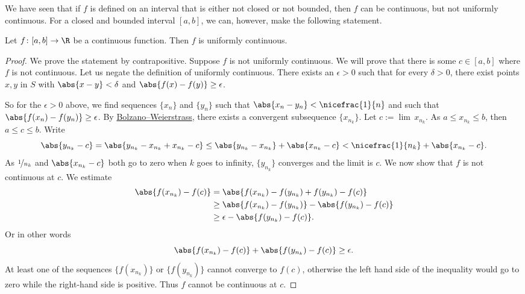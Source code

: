 \documentclass[12pt]{book}
\begin{document}
We have seen that if $f$ is defined on an interval that is either not closed
or not bounded, then $f$ can be continuous, but not uniformly continuous.
For a closed and bounded interval $[a,b]$, we can, however,
make the following statement.

\begin{thm} \label{unifcont:thm}
Let $f \colon [a,b] \to \R$ be a continuous function.
Then $f$
is uniformly continuous.
\end{thm}

\begin{proof}
We prove the statement by contrapositive.
Suppose $f$ is not uniformly continuous.
We will prove
that there is some
$c \in [a,b]$ where $f$ is not continuous.
Let us negate
the definition of uniformly continuous.
There exists an $\epsilon > 0$
such that for every $\delta > 0$, there exist points $x, y$ in $S$ with
$\abs{x-y} < \delta$ and $\abs{f(x)-f(y)} \geq \epsilon$.

So for the $\epsilon > 0$ above,
we find sequences $\{ x_n \}$ and $\{ y_n \}$ such that
$\abs{x_n-y_n} < \nicefrac{1}{n}$ and such that $\abs{f(x_n)-f(y_n)} \geq
\epsilon$.
By
\hyperref[thm:bwseq]{Bolzano--Weierstrass},
there exists a convergent subsequence
$\{ x_{n_k} \}$.
Let $c := \lim\, x_{n_k}$.
As $a \leq x_{n_k} \leq b$, then $a \leq c \leq b$.
Write
\begin{equation*}
\abs{y_{n_k} - c} =
\abs{y_{n_k} - x_{n_k} + x_{n_k} - c} \leq
\abs{y_{n_k} - x_{n_k}}
+
\abs{x_{n_k}-c}
<
\nicefrac{1}{n_k} 
+
\abs{x_{n_k}-c} .
\end{equation*}
As $\nicefrac{1}{n_k}$ and $\abs{x_{n_k}-c}$ both go to zero when
$k$ goes to infinity, $\{ y_{n_k} \}$ converges and the limit
is $c$.
We now show that $f$ is not continuous at $c$.
We
estimate
\begin{equation*}
\begin{split}
\abs{f(x_{n_k}) - f(c)} & =
\abs{f(x_{n_k}) - f(y_{n_k}) + f(y_{n_k}) - f(c)} \\
& \geq
\abs{f(x_{n_k}) - f(y_{n_k})} - \abs{f(y_{n_k}) - f(c)} \\
& \geq
\epsilon - \abs{f(y_{n_k})-f(c)} .
\end{split}
\end{equation*}
Or in other words
\begin{equation*}
\abs{f(x_{n_k})-f(c)} 
+
\abs{f(y_{n_k})-f(c)}  \geq
\epsilon .
\end{equation*}
At least one of the sequences $\{ f(x_{n_k}) \}$  or
$\{ f(y_{n_k}) \}$ cannot converge to $f(c)$, otherwise the left
hand side of the inequality would go to zero while the right-hand side is positive.
Thus $f$ cannot be continuous at $c$.
\end{proof}
\end{document}
